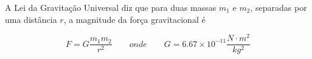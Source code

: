 A Lei da Gravitação Universal diz que para duas massas $m_1$ e $m_2$, separadas por uma distância $r$, a magnitude da força gravitacional é

\begin{equation}\label{eq:lei_da_gravidade}
    F=G\frac{m_1m_2}{r^2} \qquad onde \qquad G=6.67\times 10^{-11}\frac{N\cdot m^2}{kg^2}
\end{equation}

% 